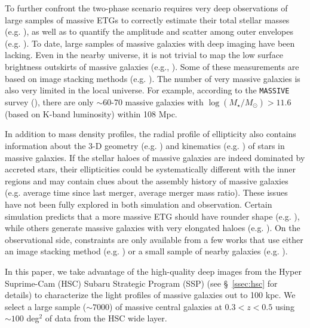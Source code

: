 \documentclass[fleqn,usenatbib]{mnras}
\def\logms{{$\log (M_{\star}/M_{\odot})$}}
\newcommand{\susan}[1]{\textcolor{Bittersweet}{\textbf{#1}}}
\begin{document}
    To further confront the two-phase scenario requires very deep observations of 
    large samples of massive ETGs to correctly estimate their total stellar masses
    (e.g. \citealt{Bernardi2013, DSouza2014}), as well as to quantify the amplitude and 
    scatter among outer envelopes (e.g. \citealt{Capaccioli2015, Iodice2016, 
    Iodice2017}).
    To date, large samples of massive galaxies with deep imaging have been lacking. 
    Even in the nearby universe, it is not trivial to map the low surface
    brightness outskirts of massive galaxies (e.g., 
    \citealt{Capaccioli2015, Iodice2016, Iodice2017, Spavone2017, Mihos2017}). 
    Some of these measurements are based on image stacking methods (e.g. 
    \citealt{Tal2011, dSouza2015}). 
    The number of very massive galaxies is also very limited in the local universe.
    For example, according to the \texttt{MASSIVE} survey (\citealt{Ma2014}), there
    are only $\sim 60$-70 massive galaxies with \logms$> 11.6$ (based on K-band 
    luminosity) within 108 Mpc.
    
    In addition to mass density profiles, the radial profile of ellipticity also 
    contains information about the 3-D geometry (e.g. \citealt{Tremblay1995, 
    Tremblay1996, Chang2013, RodriguezPadilla2013, Mitsuda2017}) and kinematics 
    (e.g. \citealt{Cappellari2012, Weijmans2014}) of stars in massive galaxies.
    If the stellar haloes of massive galaxies are indeed dominated by accreted 
    stars, their ellipticities could be systematically different with the inner 
    regions and may contain clues about the assembly history of massive galaxies 
    (e.g. average time since last merger, average merger mass ratio).
    These issues have not been fully explored in both simulation and observation.
    Certain simulation predicts that a more massive ETG should have rounder shape
    (e.g. \citealt{Wu2014}), while others generate massive galaxies with very 
    elongated haloes (e.g. \citealt{Li2017}).  
    On the observational side, constraints are only available from a few works 
    that use either an image stacking method (e.g. \citealt{Tal2011, dSouza2015}) 
    or a small sample of nearby galaxies (e.g. \citealt{Spavone2017}).
        
    In this paper, we take advantage of the high-quality deep images from the 
    Hyper Suprime-Cam (HSC) Subaru Strategic Program (SSP) \citep[SSP,][]{HSC-DR1} 
    (see \S~\ref{ssec:hsc} for details) to characterize  the light profiles of 
    massive galaxies out to 100 kpc. 
    We select a large sample (${\sim} 7000$) of massive central galaxies 
    at $0.3 < z < 0.5$ using ${\sim} 100$ deg$^2$ of data from the HSC wide layer. 
   
\end{document}
